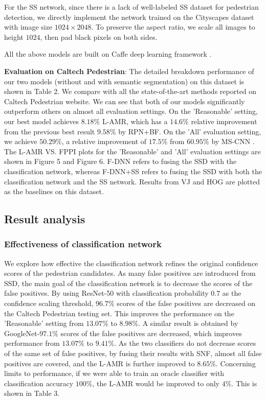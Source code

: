 \documentclass[10pt,letterpaper]{article}
\begin{document}
For the SS network, since there is a lack of well-labeled SS dataset for pedestrian detection, we directly implement the network trained on the Cityscapes dataset with image size $1024\times 2048$. To preserve the aspect ratio, we scale all images to height $1024$, then pad black pixels on both sides. 

All the above models are built on Caffe deep learning framework \cite{caffe}.

\textbf{Evaluation on Caltech Pedestrian}: The detailed breakdown performance of our two models (without and with semantic segmentation) on this dataset is shown in Table 2. We compare with all the state-of-the-art methods reported on Caltech Pedestrian website. We can see that both of our models significantly outperform others on almost all evaluation settings. On the 'Reasonable' setting, our best model achieves $8.18\%$ L-AMR, which has a $14.6\%$ relative improvement from the previous best result $9.58\%$ by RPN+BF. On the 'All' evaluation setting, we achieve $50.29\%$, a relative improvement of $17.5\%$ from $60.95\%$ by MS-CNN \cite{mscnn}. The L-AMR VS. FPPI plots for the 'Reasonable' and 'All' evaluation settings are shown in Figure 5 and Figure 6. F-DNN refers to fusing the SSD with the classification network, whereas F-DNN+SS refers to fusing the SSD with both the classification network and the SS network. Results from VJ \cite{Viola} and HOG \cite{HOG} are plotted as the baselines on this dataset.

\subsection{Result analysis}

\subsubsection{Effectiveness of classification network}
We explore how effective the classification network refines the original confidence scores of the pedestrian candidates. As many false positives are introduced from SSD, the main goal of the classification network is to decrease the scores of the false positives. By using ResNet-50 with classification probability $0.7$ as the confidence scaling threshold, $96.7\%$ scores of the false positives are decreased on the Caltech Pedestrian testing set. This improves the performance on the 'Reasonable' setting from $13.07\%$ to $8.98\%$. A similar result is obtained by GoogleNet-$97.1\%$ scores of the false positives are decreased, which improves performance from $13.07\%$ to $9.41\%$. As the two classifiers do not decrease scores of the same set of false positives, by fusing their results with SNF, almost all false positives are covered, and the L-AMR is further improved to $8.65\%$. Concerning limits to performance, if we were able to train an oracle classifier with classification accuracy $100\%$, the L-AMR would be improved to only $4\%$. This is shown in Table 3.
\end{document}
